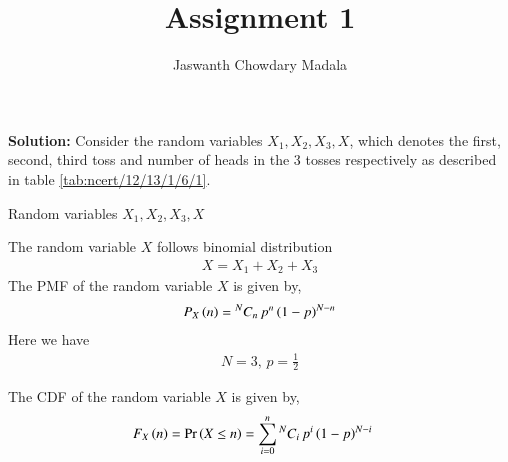 \documentclass[journal,12pt,twocolumn]{IEEEtran}
\begin{document}
\vspace{3cm}


\title{Assignment 1}
\author{Jaswanth Chowdary Madala}





\maketitle

\newpage


\bigskip

\renewcommand{\thefigure}{\theenumi}
\renewcommand{\thetable}{\theenumi}



\begin{enumerate}
\textbf{Solution:} 
		\fi
		Consider the random variables $X_1, X_2, X_3,X$, which denotes the first, second, third toss and number of heads in the 3 tosses respectively as described in table \ref{tab:ncert/12/13/1/6/1}.
\begin{table}[h]
\centering

\caption{Random variables $X_1, X_2, X_3, X$}
\label{tab:ncert/12/13/1/6/1}
\end{table}

The random variable $X$ follows binomial distribution
\begin{align}
X = X_1 + X_2 + X_3
\end{align}
The PMF of the random variable $X$ is given by,
\begin{align}
P_{X}\left(n\right) = {^{N}C_{n}} \, {p}^{n} \left(1-p\right)^{N-n}
\end{align}
Here we have
\begin{align}
N = 3, \, p = \frac{1}{2}
\end{align}

The CDF of the random variable $X$ is given by,
\begin{align}
F_{X}\left(n\right) = 	\Pr\left(X \le n\right) \label{eq:ncert/12/13/1/6/2}
&= \sum_{i = 0}^{n} {^{N}C_{i}}\, {p}^{i} \left(1-p\right)^{N-i}
\end{align}


\end{enumerate}
\end{document}
